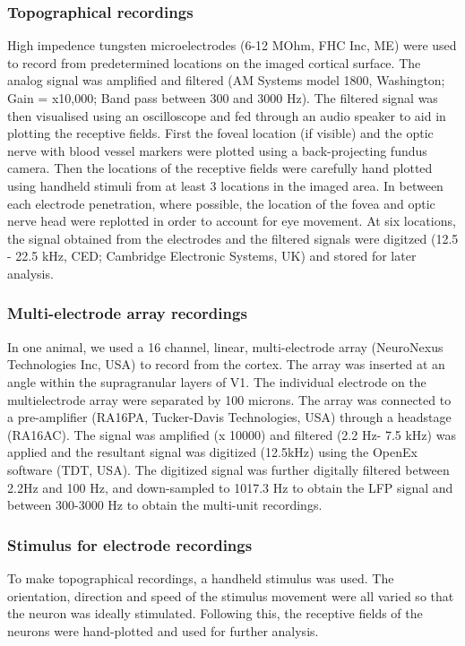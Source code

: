 		\subsubsection{Topographical recordings}
		High impedence tungsten microelectrodes (6-12 MOhm, FHC Inc, ME) were used to record from predetermined locations on the imaged cortical surface. The analog signal was amplified and filtered (AM Systems model 1800, Washington; Gain = x10,000; Band pass between 300 and 3000 Hz). The filtered signal was then visualised using an oscilloscope and fed through an audio speaker to aid in plotting the receptive fields. First the foveal location (if visible) and the optic nerve with blood vessel markers were plotted using a back-projecting fundus camera. Then the locations of the receptive fields were carefully hand plotted using handheld stimuli from at least 3 locations in the imaged area. In between each electrode penetration, where possible, the location of the fovea and optic nerve head were replotted in order to account for eye movement. At six locations, the signal obtained from the electrodes and the filtered signals were digitzed (12.5 - 22.5 kHz, CED; Cambridge Electronic Systems, UK) and stored for later analysis.
		
		\subsubsection{Multi-electrode array recordings}
		In one animal, we used a 16 channel, linear, multi-electrode array (NeuroNexus Technologies Inc, USA) to record from the cortex. The array was inserted at an angle within the supragranular layers of V1. The individual electrode on the multielectrode array were separated by 100 microns. The array was connected to a pre-amplifier (RA16PA, Tucker-Davis Technologies, USA) through a headstage (RA16AC). The signal was amplified (x 10000) and filtered (2.2 Hz- 7.5 kHz) was applied and the resultant signal was digitized (12.5kHz) using the OpenEx software (TDT, USA). The digitized signal was further digitally filtered between 2.2Hz and 100 Hz, and down-sampled to 1017.3 Hz to obtain the LFP signal and between 300-3000 Hz to obtain the multi-unit recordings.
		
		\subsubsection{Stimulus for electrode recordings}
		To make topographical recordings, a handheld stimulus was used. The orientation, direction and speed of the stimulus movement were all varied so that the neuron was ideally stimulated. Following this, the receptive fields of the neurons were hand-plotted and used for further analysis.
		
